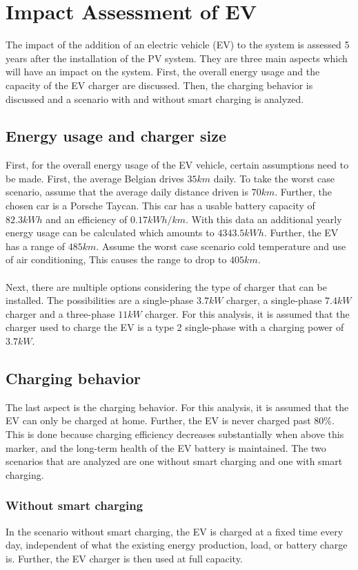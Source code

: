 \section{Impact Assessment of EV}
\label{Impact Assessment of EV}
The impact of the addition of an electric vehicle (EV) to the system is assessed 5 years after the installation of the PV system. They are three main aspects which will have an impact on the system. First, the overall energy usage and the capacity of the EV charger are discussed. Then, the charging behavior is discussed and a scenario with and without smart charging is analyzed. 
\subsection{Energy usage and charger size}
First, for the overall energy usage of the EV vehicle, certain assumptions need to be made. First, the average Belgian drives $35km$ daily. To take the worst case scenario, assume that the average daily distance driven is $70km$. Further, the chosen car is a Porsche Taycan. This car has a usable battery capacity of $82.3kWh$ and an efficiency of $0.17kWh/km$. With this data an additional yearly energy usage can be calculated which amounts to $4343.5kWh$. Further, the EV has a range of $485km$. Assume the worst case scenario cold temperature and use of air conditioning, This causes the range to drop to $405km$. \\ \\
Next, there are multiple options considering the type of charger that can be installed. The possibilities are a single-phase $3.7kW$ charger, a single-phase $7.4kW$ charger and a three-phase $11kW$ charger. For this analysis, it is assumed that the charger used to charge the EV is a type 2 single-phase with a charging power of $3.7kW$. 
\subsection{Charging behavior}
The last aspect is the charging behavior. For this analysis, it is assumed that the EV can only be charged at home. Further, the EV is never charged past 80\%. This is done because charging efficiency decreases substantially when above this marker, and the long-term health of the EV battery is maintained. The two scenarios that are analyzed are one without smart charging and one with smart charging. 
\subsubsection{Without smart charging}
In the scenario without smart charging, the EV is charged at a fixed time every day, independent of what the existing energy production, load, or battery charge is. Further, the EV charger is then used at full capacity. 
